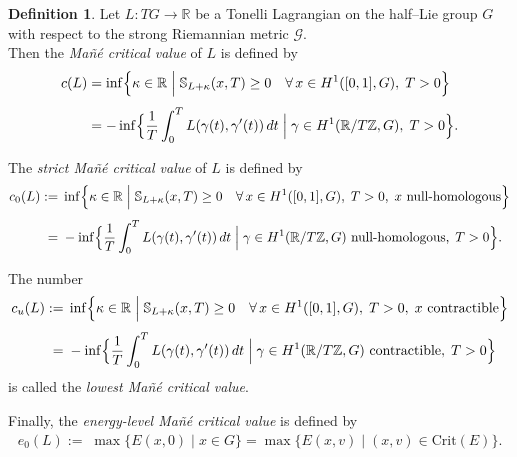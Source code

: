 \documentclass[11pt,reqno]{amsart}
\theoremstyle{plain}
\theoremstyle{definition}
\newtheorem{defn}[thm]{Definition}
\theoremstyle{plain} %
\theoremstyle{definition} %
\newtheorem{defn}[defn]{Definition}
\numberwithin{equation}{section}
\def\SS{{\mathbb{S}}}
\begin{document}
\begin{defn}\label{Def: Manes value for Tonelli Langrangians} 
  Let $L : TG \to \mathbb{R}$ be a Tonelli Lagrangian on the half--Lie group $G$ 
with respect to the strong Riemannian metric $\mathcal{G}$. \\[0.5em]
Then the \emph{Mañé critical value} of \( L \) is defined by
\begin{align*}
    c(L) 
    &= \inf \Bigl\{ 
        \kappa \in \mathbb{R} \;\Big|\; 
        \SS_{L+\kappa}(x,T) \ge 0 
        \quad \forall\, x \in H^1([0,1], G),\; T > 0 
    \Bigr\} \\[0.4em]
    &= - \inf \Bigl\{ 
        \frac{1}{T} \int_0^T L(\gamma(t), \gamma'(t))\, dt 
        \;\Big|\; 
        \gamma \in H^1(\mathbb{R}/T\mathbb{Z}, G),\; T > 0 
    \Bigr\} .
\end{align*}

\noindent
The \emph{strict Mañé critical value} of \( L \) is defined by 
\begin{align*}
    c_0(L)
    :=\; &\inf \Bigl\{ 
        \kappa \in \mathbb{R} \;\Big|\; 
        \SS_{L+\kappa}(x,T) \ge 0 
        \quad \forall\, x \in H^1([0,1], G),\; T > 0,\;
        x \text{ null-homologous} 
    \Bigr\} \\[0.4em]
    =\;& - \inf \Bigl\{ 
        \frac{1}{T} \int_0^T L(\gamma(t), \gamma'(t))\, dt 
        \;\Big|\;
        \gamma \in H^1(\mathbb{R}/T\mathbb{Z}, G) \text{ null-homologous},\; T > 0 
    \Bigr\}.
\end{align*}

\noindent
The number
\begin{align*}
    c_u(L)
    :=\; &\inf \Bigl\{ 
        \kappa \in \mathbb{R} \;\Big|\; 
        \SS_{L+\kappa}(x,T) \ge 0 
        \quad \forall\, x \in H^1([0,1], G),\; T > 0,\;
        x \text{ contractible} 
    \Bigr\} \\[0.4em]
    =\;& - \inf \Bigl\{ 
        \frac{1}{T} \int_0^T L(\gamma(t), \gamma'(t))\, dt 
        \;\Big|\;
        \gamma \in H^1(\mathbb{R}/T\mathbb{Z}, G) \text{ contractible},\; T > 0 
    \Bigr\}
\end{align*}
is called the \emph{lowest Mañé critical value}.

\medskip

\noindent
Finally, the \emph{energy-level Mañé critical value} is defined by
\begin{align*}
    e_0(L)
    :=\; \max \bigl\{ 
        E(x,0) \;\big|\; x \in G 
    \bigr\}
    = \max \bigl\{ 
        E(x,v) \;\big|\; (x,v) \in \mathrm{Crit}(E) 
    \bigr\} .
\end{align*}

\end{defn}
\end{document}
